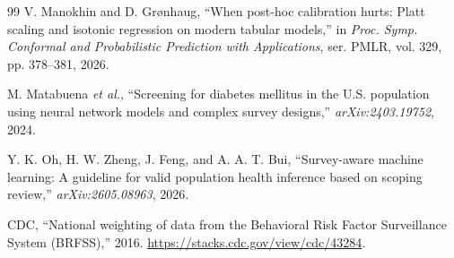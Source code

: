 \documentclass[conference]{IEEEtran}
\begin{document}
\begin{thebibliography}{99}
V. Manokhin and D. Gr{\o}nhaug, ``When post-hoc calibration hurts: Platt scaling and isotonic regression on modern tabular models,'' in \textit{Proc. Symp. Conformal and Probabilistic Prediction with Applications}, ser. PMLR, vol. 329, pp. 378--381, 2026.

M. Matabuena \textit{et al.}, ``Screening for diabetes mellitus in the U.S. population using neural network models and complex survey designs,'' \textit{arXiv:2403.19752}, 2024.

Y. K. Oh, H. W. Zheng, J. Feng, and A. A. T. Bui, ``Survey-aware machine learning: A guideline for valid population health inference based on scoping review,'' \textit{arXiv:2605.08963}, 2026.

CDC, ``National weighting of data from the Behavioral Risk Factor Surveillance System (BRFSS),'' 2016. \url{https://stacks.cdc.gov/view/cdc/43284}.
\end{thebibliography}
\end{document}
